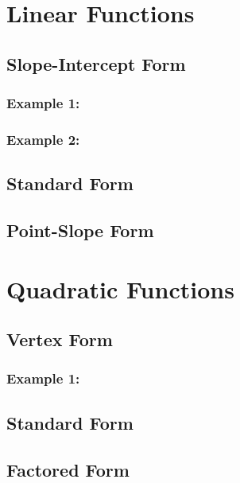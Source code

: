 \documentclass[12pt]{article}
\begin{document}
\section{Linear Functions}
    \subsection{Slope-Intercept Form}
     \subsubsection{Example 1:}
     \subsubsection{Example 2:}
    \subsection{Standard Form}
    \subsection{Point-Slope Form}
\section{Quadratic Functions}
    \subsection{Vertex Form}
        \subsubsection{Example 1:}
    \subsection{Standard Form}
    \subsection{Factored Form}
\end{document}
